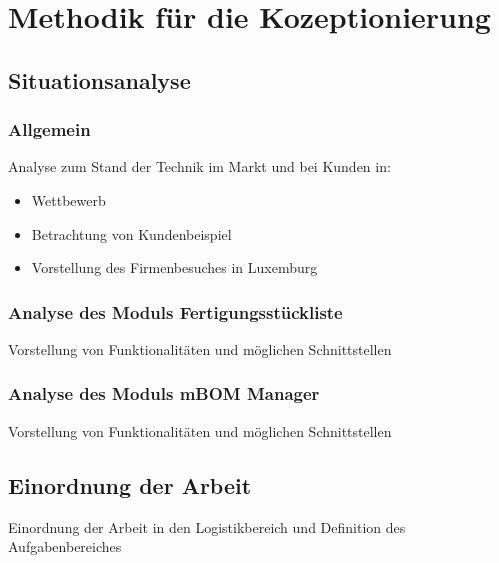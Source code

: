 \chapter{Methodik für die Kozeptionierung}

\section{Situationsanalyse}
\subsection{Allgemein}
Analyse zum Stand der Technik im Markt und bei Kunden in:
\begin{itemize}
	\item Wettbewerb
	\item Betrachtung von Kundenbeispiel
	\item Vorstellung des Firmenbesuches in Luxemburg
\end{itemize}

\subsection{Analyse des Moduls Fertigungsstückliste}
Vorstellung von Funktionalitäten und möglichen Schnittstellen

\subsection{Analyse des Moduls mBOM Manager}
Vorstellung von Funktionalitäten und möglichen Schnittstellen

\section{Einordnung der Arbeit}
Einordnung der Arbeit in den Logistikbereich und Definition des Aufgabenbereiches


